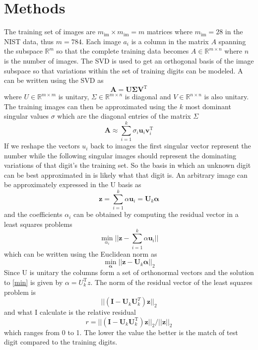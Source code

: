 \documentclass[notitlepage]{report}
\let\vec\mathbf
\newcommand{\matr}[1]{\mathbf{#1}}
\begin{document}
\newpage

\section{Methods}
The training set of images are $m_{\textrm{im}} \times m_{\textrm{im}} = m$ matrices where $m_{\textrm{im}} = 28$ in the NIST data, thus $m = 784$. Each image $a_i$ is a column in the matrix $A$ spanning the subspace $\mathbb{R}^m$ so that the complete training data becomes $A\in \mathbb{R}^{m \times n}$ where $n$ is the number of images. The SVD is used to get an orthogonal basis of the image subspace so that variations within the set of training digits can be modeled. A can be written using the SVD as
\begin{equation}
\matr{A} = \matr{U} \matr{\Sigma} \matr{V}^\textrm{T}
\end{equation}
where $U\in \mathbb{R}^{m \times m}$ is unitary, $\Sigma\in \mathbb{R}^{m \times n}$ is diagonal and $V\in \mathbb{R}^{n \times n}$ is also unitary. The training images can then be approximated using the $k$ most dominant singular values $\sigma$ which are the diagonal entries of the matrix $\Sigma$
\begin{equation}
\matr{A} \approx \sum_{i=1}^k \sigma_i \vec{u}_i \vec{v}_i^\textrm{T}
\end{equation}
If we reshape the vectors $u_i$ back to images the first singular vector represent the number while the following singular images should represent the dominating variations of that digit's the training set. So the basis in which an unknown digit can be best approximated in is likely what that digit is. An arbitrary image can be approximately expressed in the U basis as
\begin{equation}
\vec{z} = \sum_{i=1}^k \alpha \vec{u}_i = \matr{U}_k\vec{\alpha}
\end{equation}
and the coefficients $\alpha_i$ can be obtained by computing the residual vector in a least squares problems
\begin{equation}
\min_{\alpha_i} || \vec{z}-\sum_{i=1}^k \alpha \vec{u}_i||
\end{equation}
which can be written using the Euclidean norm as
\begin{equation}
\label{min}
\min_{\vec{\alpha}} || \vec{z}-\matr{U}_k \vec{\alpha}||_2
\end{equation}
Since U is unitary the columns form a set of orthonormal vectors and the solution to \eqref{min} is given by $\alpha = U_k^\textrm{T} z$. The norm of the residual vector of the least squares problem is
\begin{equation}
||(\matr{I} - \matr{U}_k \matr{U}_k^T)\vec{z}||_2
\end{equation}
and what I calculate is the relative residual
\begin{equation}
\label{res}
r = ||(\matr{I} - \matr{U}_k \matr{U}_k^\textrm{T})\vec{z}||_2/||\vec{z}||_2
\end{equation}
which ranges from 0 to 1. The lower the value the better is the match of test digit compared to the training digits. \cite{eldén_2006}
\end{document}
